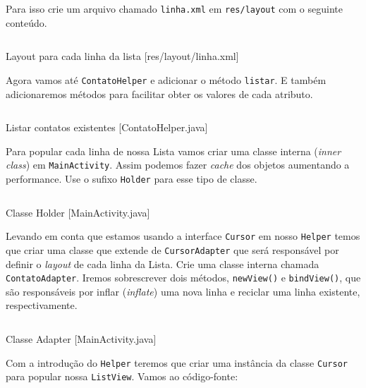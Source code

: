 Para isso crie um arquivo chamado \texttt{linha.xml} em \texttt{res/layout} com o seguinte conteúdo.

\begin{listing}[H]
  \inputminted[linenos=true,frame=bottomline,tabsize=3]{ xml }{ source/linha-1.xml }
  \caption{Layout para cada linha da lista [res/layout/linha.xml]}
\end{listing}

Agora vamos até \texttt{ContatoHelper} e adicionar o método \texttt{listar}. E também adicionaremos
métodos para facilitar obter os valores de cada atributo.

\begin{listing}[H]
  \inputminted[linenos=true,frame=bottomline,tabsize=3]{ java }{ source/ContatoHelper-3.java }
  \caption{Listar contatos existentes [ContatoHelper.java]}
\end{listing}

Para popular cada linha de nossa Lista vamos criar uma classe interna (\textit{inner class}) em
\texttt{MainActivity}. Assim podemos fazer \textit{cache} dos objetos aumentando a performance.
Use o sufixo \texttt{Holder} para esse tipo de classe.

\begin{listing}[H]
  \inputminted[linenos=true,frame=bottomline,tabsize=3]{ java }{ source/MainActivity-4.java }
  \caption{Classe Holder [MainActivity.java]}
\end{listing}

Levando em conta que estamos usando a interface \texttt{Cursor} em nosso \texttt{Helper} temos
que criar uma classe que extende de \texttt{CursorAdapter} que será responsável por definir o
\textit{layout} de cada linha da Lista. Crie uma classe interna chamada \texttt{ContatoAdapter}.
Iremos sobrescrever dois métodos, \texttt{newView()} e \texttt{bindView()}, que são responsáveis
por inflar (\textit{inflate}) uma nova linha e reciclar uma linha existente, respectivamente.

\begin{listing}[H]
  \inputminted[linenos=true,frame=bottomline,tabsize=3]{ java }{ source/MainActivity-5.java }
  \caption{Classe Adapter [MainActivity.java]}
\end{listing}

Com a introdução do \texttt{Helper} teremos que criar uma instância da classe \texttt{Cursor}
para popular nossa \texttt{ListView}. Vamos ao código-fonte:

